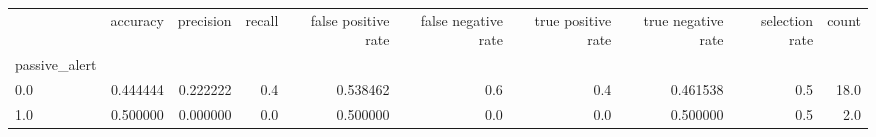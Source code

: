 \begin{tabular}{lrrrrrrrrr}
\toprule
{} &  accuracy &  precision &  recall &  false positive rate &  false negative rate &  true positive rate &  true negative rate &  selection rate &  count \\
passive\_alert &           &            &         &                      &                      &                     &                     &                 &        \\
\midrule
0.0           &  0.444444 &   0.222222 &     0.4 &             0.538462 &                  0.6 &                 0.4 &            0.461538 &             0.5 &   18.0 \\
1.0           &  0.500000 &   0.000000 &     0.0 &             0.500000 &                  0.0 &                 0.0 &            0.500000 &             0.5 &    2.0 \\
\bottomrule
\end{tabular}
